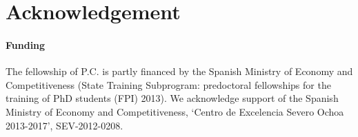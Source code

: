 \documentclass{bioinfo}
\begin{document}
\section*{Acknowledgement}

\paragraph{Funding\textcolon}
The fellowship of P.C. is partly financed by the Spanish Ministry
of Economy and Competitiveness (State Training Subprogram: predoctoral
fellowships for the training of PhD students (FPI) 2013).
We acknowledge support of the Spanish Ministry of Economy and
Competitiveness, `Centro de Excelencia Severo Ochoa 2013-2017',
SEV-2012-0208.



\end{document}
